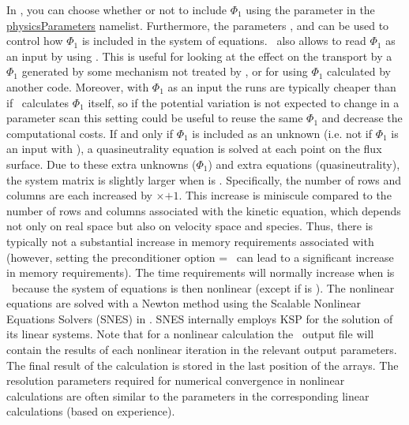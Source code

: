 In \sfincs, you can choose whether or not to
include $\Phi_1$ using the parameter  in the 
{\ttfamily \hyperref[sec:physicsParameters]{physicsParameters}}
namelist. 
Furthermore, the parameters ,  and  can be used to control how $\Phi_1$ is included in the system of equations. 
\sfincs~also allows to read $\Phi_1$ as an input by using . This is useful for looking at the effect on the transport by a $\Phi_1$ generated by some mechanism not treated by \sfincs, or for using $\Phi_1$ calculated by another code. Moreover, with $\Phi_1$ as an input the runs are typically cheaper than if \sfincs~calculates $\Phi_1$ itself, so if the potential variation is not expected to change in a parameter scan this setting could be useful to reuse the same $\Phi_1$ and decrease the computational costs. 
If and only if $\Phi_1$ is included as an unknown (i.e. not if $\Phi_1$ is an input with ), a quasineutrality equation is solved
at each point on the flux surface.  Due to these extra unknowns ($\Phi_1$) and extra equations
(quasineutrality), the system matrix is slightly larger when  is \true.
Specifically, the number of rows and columns are each increased by \Ntheta$\times$\Nzeta$+1$.  This increase is miniscule compared
to the number of rows and columns associated with the kinetic equation, which depends not only on real space
but also on velocity space and species.  
Thus, there is typically not a substantial increase in memory requirements associated with  (however, setting the preconditioner option  = \false~can lead to a significant increase in memory requirements). 
The time requirements will normally increase when  is \true~because the system of equations is then nonlinear (except if  is \true). 
The nonlinear equations are solved with a Newton method using the Scalable Nonlinear Equations Solvers (SNES) in \PETSc. SNES internally employs KSP for the solution of its linear systems. 
Note that for a nonlinear calculation the \sfincs~output file  will contain the results of each nonlinear iteration in the relevant output parameters. The final result of the calculation is stored in the last position of the arrays. 
The resolution parameters required for numerical convergence in nonlinear calculations are often similar to the parameters in the corresponding linear calculations (based on experience). 

